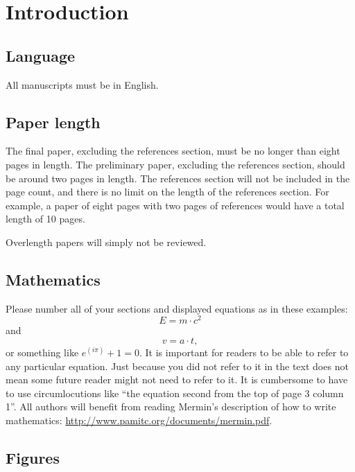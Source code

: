 \section{Introduction}
\label{sec:intro}

\subsection{Language}

All manuscripts must be in English.

\subsection{Paper length}
The final paper, excluding the references section, must be no longer than eight pages in length. The preliminary paper, excluding the references section, should be around two pages in length.
The references section will not be included in the page count, and there is no limit on the length of the references section.
For example, a paper of eight pages with two pages of references would have a total length of 10 pages.

Overlength papers will simply not be reviewed.
\subsection{Mathematics}

Please number all of your sections and displayed equations as in these examples:
\begin{equation}
  E = m\cdot c^2
  \label{eq:important}
\end{equation}
and
\begin{equation}
  v = a\cdot t,
  \label{eq:also-important}
\end{equation}
or something like $e^{(i\pi)} + 1 = 0$.
It is important for readers to be able to refer to any particular equation.
Just because you did not refer to it in the text does not mean some future reader might not need to refer to it.
It is cumbersome to have to use circumlocutions like ``the equation second from the top of page 3 column 1''.
All authors will benefit from reading Mermin's description of how to write mathematics:
\url{http://www.pamitc.org/documents/mermin.pdf}.

\subsection{Figures}

